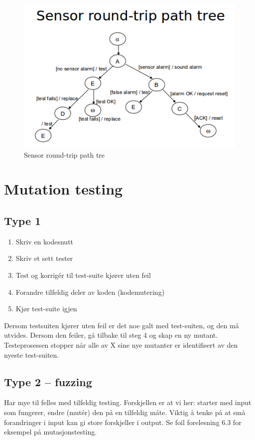\begin{figure}[htbp]
\centering
\includegraphics{Forelesning 06/img/5.png}
\caption{Sensor round-trip path tre}
\end{figure}

\section{Mutation testing}

\subsection{Type 1}

\begin{enumerate}[1.]
\item
  Skriv en kodesnutt
\item
  Skriv et sett tester
\item
  Test og korrigér til test-suite kjører uten feil
\item
  Forandre tilfeldig deler av koden (kodemutering)
\item
  Kjør test-suite igjen
\end{enumerate}
Dersom testsuiten kjører uten feil er det noe galt med test-suiten, og
den må utvides. Dersom den feiler, gå tilbake til steg 4 og skap en ny
mutant. Testeprosessen stopper når alle av X sine nye mutanter er
identifisert av den nyeste test-suiten.

\subsection{Type 2 -- fuzzing}

Har mye til felles med tilfeldig testing. Forskjellen er at vi her:
starter med input som fungerer, endre (mutér) den på en tilfeldig måte.
Viktig å tenke på at små forandringer i input kan gi store forskjeller i
output. Se foil forelesning 6.3 for eksempel på mutasjonstesting.


